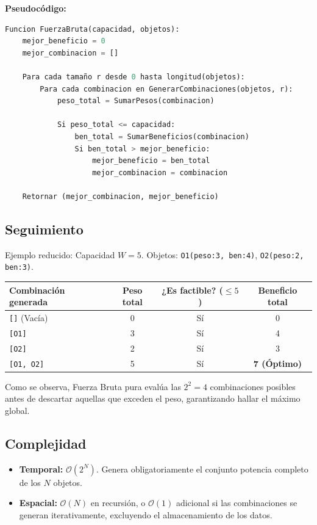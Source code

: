 \documentclass[11pt,a4paper]{article}
\begin{document}
\textbf{Pseudocódigo:}
\begin{lstlisting}[language=Python]
Funcion FuerzaBruta(capacidad, objetos):
    mejor_beneficio = 0
    mejor_combinacion = []

    Para cada tamaño r desde 0 hasta longitud(objetos):
        Para cada combinacion en GenerarCombinaciones(objetos, r):
            peso_total = SumarPesos(combinacion)

            Si peso_total <= capacidad:
                ben_total = SumarBeneficios(combinacion)
                Si ben_total > mejor_beneficio:
                    mejor_beneficio = ben_total
                    mejor_combinacion = combinacion

    Retornar (mejor_combinacion, mejor_beneficio)
\end{lstlisting}

\subsection{Seguimiento}
Ejemplo reducido: Capacidad $W = 5$. Objetos: \texttt{O1(peso:3, ben:4)}, \texttt{O2(peso:2, ben:3)}.

\begin{table}[h!]
    \centering
    \begin{tabular}{@{}lccc@{}}
        \toprule
        \textbf{Combinación generada} & \textbf{Peso total} & \textbf{¿Es factible? ($\le 5$)} & \textbf{Beneficio total} \\ \midrule
        \texttt{[]} (Vacía) & 0 & Sí & 0 \\
        \texttt{[O1]} & 3 & Sí & 4 \\
        \texttt{[O2]} & 2 & Sí & 3 \\
        \texttt{[O1, O2]} & 5 & Sí & \textbf{7 (Óptimo)} \\ \bottomrule
    \end{tabular}
\end{table}
Como se observa, Fuerza Bruta pura evalúa las $2^2 = 4$ combinaciones posibles antes de descartar aquellas que exceden el peso, garantizando hallar el máximo global.

\subsection{Complejidad}
\begin{itemize}
    \item \textbf{Temporal:} $\mathcal{O}(2^N)$. Genera obligatoriamente el conjunto potencia completo de los $N$ objetos.
    \item \textbf{Espacial:} $\mathcal{O}(N)$ en recursión, o $\mathcal{O}(1)$ adicional si las combinaciones se generan iterativamente, excluyendo el almacenamiento de los datos.
\end{itemize}
\end{document}
